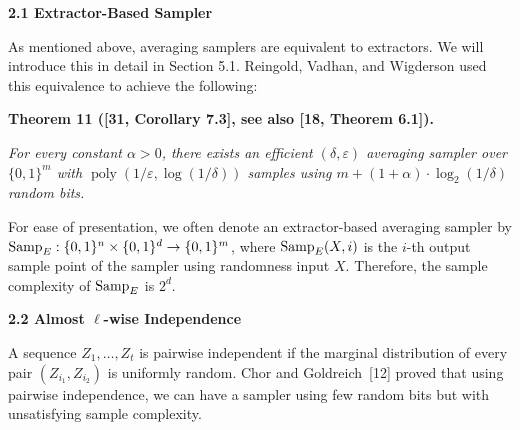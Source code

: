 


\par\medskip\noindent\textbf{
2.1 Extractor-Based Sampler}\par




As mentioned above, averaging samplers are equivalent to extractors. We will introduce this in detail in Section 5.1.
Reingold, Vadhan, and Wigderson used this equivalence to achieve the following:\par





\par\medskip\noindent\textbf{
\textbf{Theorem 11}\textbf{ }([31, Corollary 7.3], see also [18, Theorem 6.1])\textbf{.}
}\par



\emph{For every constant $\alpha>0$, there exists an efficient $(\delta,\varepsilon)$ averaging sampler over $\{0,1\}^{m}$ with $\operatorname*{poly}(1/\varepsilon,\log(1/\delta))$ samples using $m+(1+\alpha)\cdot\log_{2}(1/\delta)$ random bits.}\par






For ease of presentation, we often denote an extractor-based averaging sampler by $\textup{{Samp}}_{E}:\{0,1\}^{n}\times\{0,1\}^{d}\to\{0,1\}^{m}$, where $\textup{{Samp}}_{E}(X,i)$ is the $i$-th output sample point of the sampler using randomness input $X$. Therefore, the sample complexity of $\textup{{Samp}}_{E}$ is $2^{d}$.\par





\par\medskip\noindent\textbf{
2.2 Almost $\ell$-wise Independence}\par




A sequence $Z_{1},\dots,Z_{t}$ is pairwise independent if the marginal distribution of every pair $(Z_{i_{1}},Z_{i_{2}})$ is uniformly random.
Chor and Goldreich [12] proved that using pairwise independence, we can have a sampler using few random bits but with unsatisfying sample complexity.\par



